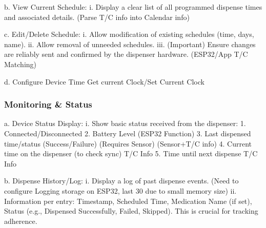   b. View Current Schedule:
  i. Display a clear list of all programmed dispense times and associated details. (Parse T/C info into Calendar info)
  
  c. Edit/Delete Schedule:
  i. Allow modification of existing schedules (time, days, name).
  ii. Allow removal of unneeded schedules.
  iii. (Important) Ensure changes are reliably sent and confirmed by the dispenser hardware. (ESP32/App T/C Matching)
  
  d. Configure Device Time Get current Clock/Set Current Clock
  
\subsubsection{Monitoring \&  Status}

a. Device Status Display:
i. Show basic status received from the dispenser:
1. Connected/Disconnected
2. Battery Level (ESP32 Function)
3. Last dispensed time/status (Success/Failure) (Requires Sensor) (Sensor+T/C info)
4. Current time on the dispenser (to check sync) T/C Info
5. Time until next dispense T/C Info

b. Dispense History/Log:
i. Display a log of past dispense events. (Need to configure Logging storage on ESP32, last 30 due to small memory size)
ii. Information per entry: Timestamp, Scheduled Time, Medication Name (if set), Status (e.g., Dispensed Successfully, Failed, Skipped). This is crucial for tracking adherence.
